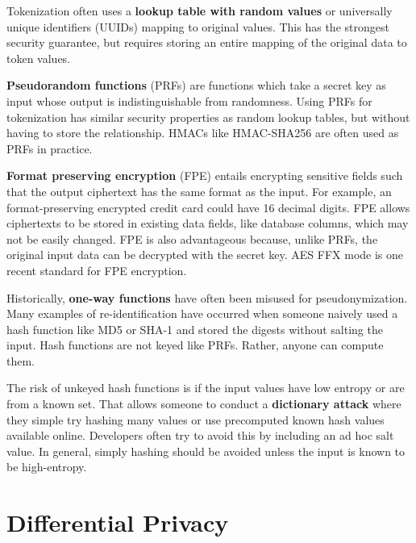 \documentclass[nobib]{tufte-handout}
\begin{document}
Tokenization often uses a \textbf{lookup table with random values} or
universally unique identifiers (UUIDs) mapping to original values. This has the
strongest security guarantee, but requires storing an entire mapping of the
original data to token values.

\textbf{Pseudorandom functions} (PRFs) are functions which take a secret key as
input whose output is indistinguishable from randomness. Using PRFs for
tokenization has similar security properties as random lookup tables, but
without having to store the relationship. HMACs like HMAC-SHA256 are often
used as PRFs in practice.

\textbf{Format preserving encryption} \cite{DBLP:conf/sacrypt/BellareRRS09}
(FPE) entails encrypting sensitive fields such that the output ciphertext has
the same format as the input. For example, an format-preserving encrypted credit
card could have 16 decimal digits. FPE allows ciphertexts to be stored in
existing data fields, like database columns, which may not be easily changed.
FPE is also advantageous because, unlike PRFs, the original input data can be
decrypted with the secret key. AES FFX mode \cite{dworkin2016recommendation}
is one recent standard for FPE encryption.


Historically, \textbf{one-way functions} have often been misused for
pseudonymization. Many examples of re-identification have occurred when someone
naively used a hash function like MD5 or SHA-1 and stored the digests without
salting the input. Hash functions are not keyed like PRFs. Rather, anyone can
compute them.

The risk of unkeyed hash functions is if the input values have low entropy or
are from a known set. That allows someone to conduct a \textbf{dictionary
attack} where they simple try hashing many values or use precomputed known hash
values available online. Developers often try to avoid this by including an ad
hoc salt value. In general, simply hashing should be avoided unless the input is
known to be high-entropy.

\section{Differential Privacy}
\end{document}
